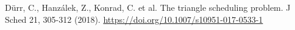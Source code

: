 \documentclass[a4paper,12pt]{article}
\theoremstyle{definition}
\theoremstyle{plain}
\begin{document}
    \begin{thebibliography}{9}


        
          Dürr, C., Hanzálek, Z., Konrad, C. et al. The triangle scheduling problem. J Sched 21, 305-312 (2018). \href{https://doi.org/10.1007/s10951-017-0533-1}{https://doi.org/10.1007/s10951-017-0533-1 }

        \end{thebibliography}
\end{document}
